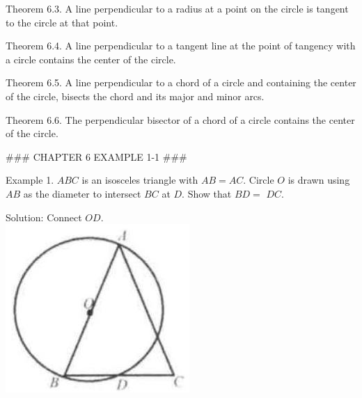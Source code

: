 \documentclass[10pt]{article}
\begin{document}
Theorem 6.3. A line perpendicular to a radius at a point on the circle is tangent to the circle at that point.

Theorem 6.4. A line perpendicular to a tangent line at the point of tangency with a circle contains the center of the circle.

Theorem 6.5. A line perpendicular to a chord of a circle and containing the center of the circle, bisects the chord and its major and minor arcs.

Theorem 6.6. The perpendicular bisector of a chord of a circle contains the center of the circle.


### CHAPTER 6 EXAMPLE 1-1 ###

Example 1. \(A B C\) is an isosceles triangle with \(A B=A C\). Circle \(O\) is drawn using \(A B\) as the diameter to intersect \(B C\) at \(D\). Show that \(B D=\) \(D C\).

Solution:
Connect \(O D\).\\
\includegraphics[max width=\textwidth, center]{2025_04_17_97bc1f7e44d93c271a88g-147(2)}
\end{document}
